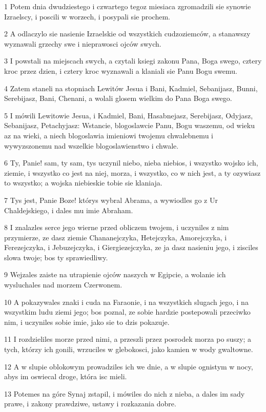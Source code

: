 \par 1 Potem dnia dwudziestego i czwartego tegoz miesiaca zgromadzili sie synowie Izraelscy, i poscili w worzech, i posypali sie prochem.
\par 2 A odlaczylo sie nasienie Izraelskie od wszystkich cudzoziemców, a stanawszy wyznawali grzechy swe i nieprawosci ojców swych.
\par 3 I powstali na miejscach swych, a czytali ksiegi zakonu Pana, Boga swego, cztery kroc przez dzien, i cztery kroc wyznawali a klaniali sie Panu Bogu swemu.
\par 4 Zatem staneli na stopniach Lewitów Jesua i Bani, Kadmiel, Sebanijasz, Bunni, Serebijasz, Bani, Chenani, a wolali glosem wielkim do Pana Boga swego.
\par 5 I mówili Lewitowie Jesua, i Kadmiel, Bani, Hasabnejasz, Serebijasz, Odyjasz, Sebanijasz, Petachyjasz: Wstancie, blogoslawcie Panu, Bogu waszemu, od wieku az na wieki, a niech blogoslawia imieniowi twojemu chwalebnemu i wywyzszonemu nad wszelkie blogoslawienstwo i chwale.
\par 6 Ty, Panie! sam, ty sam, tys uczynil niebo, nieba niebios, i wszystko wojsko ich, ziemie, i wszystko co jest na niej, morza, i wszystko, co w nich jest, a ty ozywiasz to wszystko; a wojska niebieskie tobie sie klaniaja.
\par 7 Tys jest, Panie Boze! którys wybral Abrama, a wywiodles go z Ur Chaldejskiego, i dales mu imie Abraham.
\par 8 I znalazles serce jego wierne przed obliczem twojem, i uczyniles z nim przymierze, ze dasz ziemie Chananejczyka, Hetejczyka, Amorejczyka, i Ferezejczyka, i Jebuzejczyka, i Giergiezejczyka, ze ja dasz nasieniu jego, i zisciles slowa twoje; bos ty sprawiedliwy.
\par 9 Wejzales zaiste na utrapienie ojców naszych w Egipcie, a wolanie ich wysluchales nad morzem Czerwonem.
\par 10 A pokazywales znaki i cuda na Faraonie, i na wszystkich slugach jego, i na wszystkim ludu ziemi jego; bos poznal, ze sobie hardzie postepowali przeciwko nim, i uczyniles sobie imie, jako sie to dzis pokazuje.
\par 11 I rozdzieliles morze przed nimi, a przeszli przez posrodek morza po suszy; a tych, którzy ich gonili, wrzuciles w glebokosci, jako kamien w wody gwaltowne.
\par 12 A w slupie oblokowym prowadziles ich we dnie, a w slupie ognistym w nocy, abys im oswiecal droge, która isc mieli.
\par 13 Potemes na góre Synaj zstapil, i mówiles do nich z nieba, a dales im sady prawe, i zakony prawdziwe, ustawy i rozkazania dobre.
